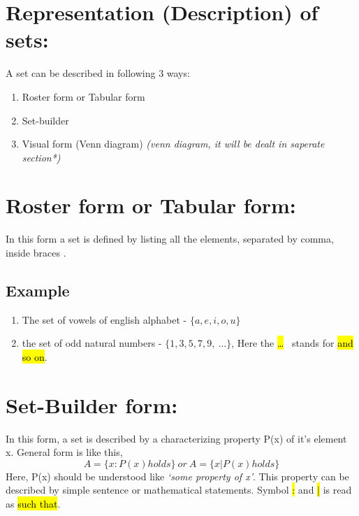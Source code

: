 \documentclass[./main.tex]{subfiles}
\begin{document}
\section*{Representation (Description) of sets:} A set can be described in following 3 ways:
\begin{enumerate}
\item Roster form or Tabular form
\item Set-builder
\item Visual form (Venn diagram) \small{\emph{(venn diagram, it will be dealt in saperate section*)}}
\end{enumerate}

\section*{Roster form or Tabular form:}
In this form a set is defined by listing all the elements, separated by comma, inside braces
\emph{\textbraceleft \textbraceright}.

\subsection*{Example}
\begin{enumerate}
\item The set of vowels of english alphabet -  $\{a, e, i, o, u\}$
\item the set of odd natural numbers - $\{1, 3, 5, 7, 9, \ \ldots \}$,
     Here the \hl{\ldots} \ stands for \hl{and so on}.
\end{enumerate}


\section*{Set-Builder form:} In this form, a set is described by a characterizing property P(x) of it's element x.
General form is like this,
\[
A = \{x : P(x) holds\}\ or \
A = \{x | P(x) holds\}
\]
Here, P(x) should be understood like \emph{`some property of x'}. This property can be described by simple sentence or mathematical statements. Symbol \hl{:} and \hl{|} is read as \hl{such that}.
\end{document}
